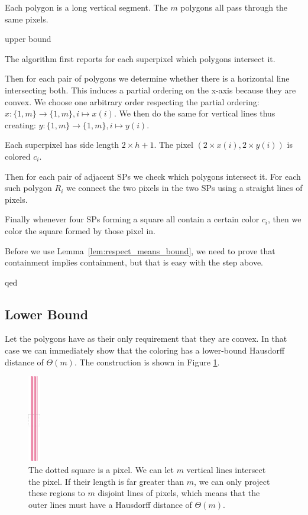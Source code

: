 \documentclass[a4paper, UKenglish]{lipics-v2018}
\begin{document}
Each polygon is a long vertical segment. The $m$ polygons all pass through the same pixels.

upper bound

The algorithm first reports for each superpixel which  polygons intersect it.

Then for each pair of polygons we determine whether there is a horizontal line intersecting both. This induces a partial ordering on the x-axis because they are convex.
We choose one arbitrary order respecting the partial ordering: $x: \{1, m\}\to \{1, m\}, i\mapsto x(i)$.
We then do the same for vertical lines thus creating: $y: \{1, m\}\to \{1, m\}, i\mapsto y(i)$.

Each superpixel has side length $2\times h+1$. The pixel $(2\times x(i), 2\times y(i))$ is colored $c_i$.

Then for each pair of adjacent SPs we check which polygons intersect it. For each such polygon $R_i$ we connect the two pixels in the two SPs using a straight lines of pixels.

Finally whenever four SPs forming a square all contain a certain color $c_i$, then we color the square formed by those pixel in.

Before we use Lemma~\ref{lem:respect_means_bound}, we need to prove that containment implies containment, but that is easy with the step above.

qed


\subsection{Lower Bound}
\label{sub:convex_lower}

Let the polygons have as their only requirement that they are convex. In that case we can immediately show that the coloring has a lower-bound Hausdorff distance of $\Theta(m)$. The construction is shown in Figure \ref{fig:linesexample}.

\begin{figure}[H]
\centering
\includegraphics[width=20px]{Figures/linesexample.png}
\caption{The dotted square is a pixel. We can let $m$ vertical lines intersect the pixel. If their length is far greater than $m$, we can only project these regions to $m$ disjoint lines of pixels, which means that the outer lines must have a Hausdorff distance of $\Theta(m)$.}
\label{fig:linesexample}
\end{figure}
\end{document}
